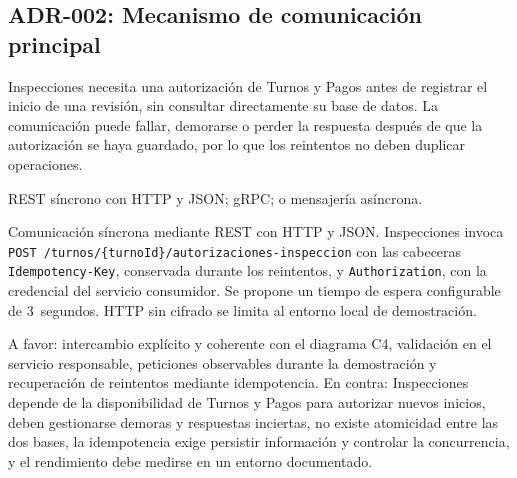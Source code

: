 \documentclass[11pt,a4paper]{article}
\begin{document}
\subsection{ADR-002: Mecanismo de comunicación principal}
\begin{description}[leftmargin=3.2cm,style=nextline]
  \item[Contexto] Inspecciones necesita una autorización de Turnos y Pagos antes de registrar el inicio de una revisión, sin consultar directamente su base de datos. La comunicación puede fallar, demorarse o perder la respuesta después de que la autorización se haya guardado, por lo que los reintentos no deben duplicar operaciones.
  \item[Opciones] REST síncrono con HTTP y JSON; gRPC; o mensajería asíncrona.
  \item[Decisión] Comunicación síncrona mediante REST con HTTP y JSON. Inspecciones invoca \texttt{POST /turnos/\{turnoId\}/autorizaciones-inspeccion} con las cabeceras \texttt{Idempotency-Key}, conservada durante los reintentos, y \texttt{Authorization}, con la credencial del servicio consumidor. Se propone un tiempo de espera configurable de 3~segundos. HTTP sin cifrado se limita al entorno local de demostración.
  \item[Consecuencias] A favor: intercambio explícito y coherente con el diagrama C4, validación en el servicio responsable, peticiones observables durante la demostración y recuperación de reintentos mediante idempotencia. En contra: Inspecciones depende de la disponibilidad de Turnos y Pagos para autorizar nuevos inicios, deben gestionarse demoras y respuestas inciertas, no existe atomicidad entre las dos bases, la idempotencia exige persistir información y controlar la concurrencia, y el rendimiento debe medirse en un entorno documentado.
\end{description}

\end{document}
